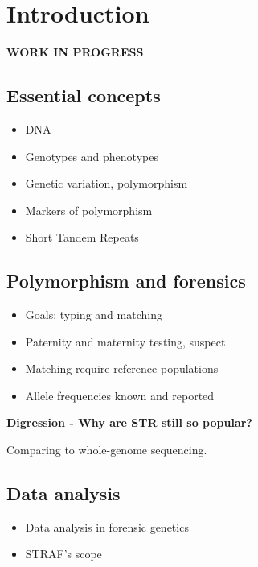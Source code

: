\documentclass[
  a5paper]{book}
\begin{document}
\hypertarget{introduction}{%
\chapter*{Introduction}\label{introduction}}

\textbf{WORK IN PROGRESS}

\hypertarget{essential-concepts}{%
\section*{Essential concepts}\label{essential-concepts}}

\begin{itemize}
\item
  DNA
\item
  Genotypes and phenotypes
\item
  Genetic variation, polymorphism
\item
  Markers of polymorphism
\item
  Short Tandem Repeats
\end{itemize}

\hypertarget{polymorphism-and-forensics}{%
\section*{Polymorphism and forensics}\label{polymorphism-and-forensics}}

\begin{itemize}
\item
  Goals: typing and matching
\item
  Paternity and maternity testing, suspect
\item
  Matching require reference populations
\item
  Allele frequencies known and reported
\end{itemize}

\textbf{Digression - Why are STR still so popular?}

Comparing to whole-genome sequencing.

\hypertarget{data-analysis}{%
\section*{Data analysis}\label{data-analysis}}

\begin{itemize}
\item
  Data analysis in forensic genetics
\item
  STRAF's scope
\end{itemize}
\end{document}
